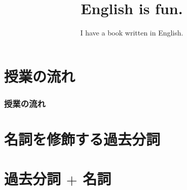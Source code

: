 \documentclass[aspectratio=169,xcolor={dvipsnames,table}]{beamer}
\title{English is fun.}
\subtitle{I have a book written in English.}
\author{}
\institute[]{}
\date[]
\begin{document}
\begin{frame}[plain]
  \titlepage
\end{frame}

\section*{授業の流れ}
\begin{frame}[plain]
  \frametitle{授業の流れ}
  \tableofcontents
\end{frame} 
\section*{名詞を修飾する過去分詞}
\section{過去分詞 $+$ 名詞}
\end{document}
